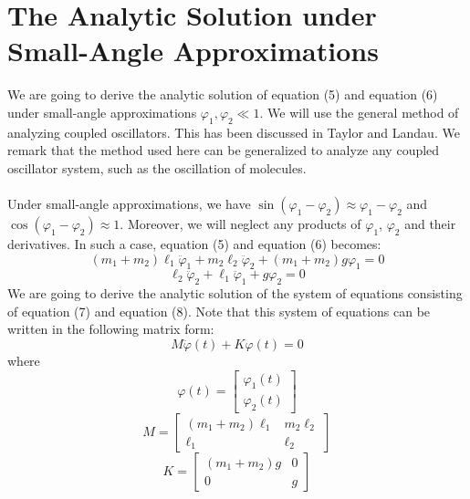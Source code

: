 \documentclass[11pt]{article}
\begin{document}
\section{The Analytic Solution under Small-Angle Approximations}
We are going to derive the analytic solution of equation (5) and equation (6) under small-angle approximations
\(\varphi_1, \varphi_2 \ll 1\).
We will use the general method of analyzing coupled oscillators. This has been discussed in Taylor\cite{Taylor} and
Landau\cite{Landau}.
We remark that the method used here can be generalized to analyze any coupled
oscillator system, such as the oscillation of molecules\cite{Landau}. \\
\\
Under small-angle approximations, we have \(\sin(\varphi_1 -\varphi_2)\approx \varphi_1 - \varphi_2\) and
\(\cos(\varphi_1 -\varphi_2)\approx 1\). Moreover, we will neglect any products of \(\varphi_1\), \(\varphi_2\)
and their derivatives. In such a case, equation (5) and equation (6) becomes:
\begin{equation}
  (m_1+m_2)\ell_1 \ddot{\varphi}_1 + m_2 \ell_2 \ddot{\varphi}_2 + (m_1+m_2)g \varphi_1 = 0
\end{equation}
\begin{equation}
  \ell_2 \ddot{\varphi}_2 +  \ell_1\ddot{\varphi}_1+  g \varphi_2 = 0
\end{equation}
We are going to derive the analytic solution of the system of equations consisting of equation (7) and equation (8).
Note that this system of equations can be written in the following matrix form:
\begin{equation}
  M \ddot{ \varphi }(t) + K \varphi(t) = 0
\end{equation}
where
\begin{equation*}
  \varphi(t)
  =
  \begin{bmatrix}
    \varphi_1(t)\\
    \varphi_2(t)
  \end{bmatrix}
\end{equation*}
\begin{equation*}
  M =
  \begin{bmatrix}
    (m_1+m_2)\ell_1 & m_2\ell_2 \\
    \ell_1 & \ell_2
  \end{bmatrix}
\end{equation*}
\begin{equation*}
  K =
  \begin{bmatrix}
    (m_1+m_2)g & 0\\
    0 & g
  \end{bmatrix}
\end{equation*}
\end{document}
